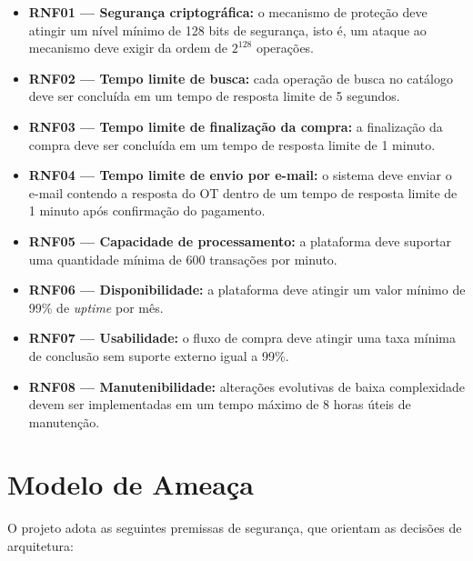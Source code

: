\documentclass[12pt, oneside, a4paper, english, brazil]{abntex2}
\begin{document}
\begin{itemize}
\item \textbf{RNF01 --- Segurança criptográfica:} o mecanismo de proteção deve
atingir um nível mínimo de 128 bits de segurança, isto é, um ataque ao
mecanismo deve exigir da ordem de $2^{128}$ operações.

\item \textbf{RNF02 --- Tempo limite de busca:} cada operação de busca no
catálogo deve ser concluída em um tempo de resposta limite de 5 segundos.

\item \textbf{RNF03 --- Tempo limite de finalização da compra:} a finalização
da compra deve ser concluída em um tempo de resposta limite de 1 minuto.

\item \textbf{RNF04 --- Tempo limite de envio por e-mail:} o sistema deve
enviar o e-mail contendo a resposta do OT dentro de um tempo de resposta
limite de 1 minuto após confirmação do pagamento.

\item \textbf{RNF05 --- Capacidade de processamento:} a plataforma deve
suportar uma quantidade mínima de 600 transações por minuto.

\item \textbf{RNF06 --- Disponibilidade:} a plataforma deve atingir um valor
mínimo de 99\% de \emph{uptime} por mês.

\item \textbf{RNF07 --- Usabilidade:} o fluxo de compra deve atingir uma taxa
mínima de conclusão sem suporte externo igual a 99\%.

\item \textbf{RNF08 --- Manutenibilidade:} alterações evolutivas de baixa
complexidade devem ser implementadas em um tempo máximo de 8 horas úteis de
manutenção.
\end{itemize}

\section{Modelo de Ameaça}

O projeto adota as seguintes premissas de segurança, que orientam as decisões
de arquitetura:
\end{document}

